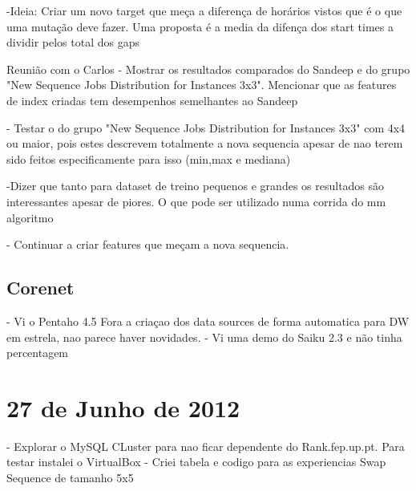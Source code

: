 \documentclass[a4paper,10pt]{article}
\begin{document}
-Ideia: Criar um novo target que meça a diferença de horários vistos que é o que uma mutação deve fazer. Uma proposta é a media da difença dos start times a dividir pelos total dos gaps

Reunião com o Carlos
- Mostrar os resultados comparados do Sandeep e do grupo "New Sequence Jobs Distribution for Instances 3x3". Mencionar que as features de index criadas tem desempenhos semelhantes ao Sandeep

- Testar o do grupo "New Sequence Jobs Distribution for Instances 3x3" com 4x4 ou maior, pois estes descrevem totalmente a nova sequencia apesar de nao terem sido feitos especificamente para isso (min,max e mediana)

-Dizer que tanto para dataset de treino pequenos e grandes os resultados são interessantes apesar de piores. O que pode ser utilizado numa corrida do mm algoritmo

- Continuar a criar features que meçam a nova sequencia.

\subsection{Corenet}

- Vi o Pentaho 4.5  Fora a criaçao dos data sources de forma automatica para DW em estrela, nao parece haver novidades. 
- Vi uma demo do Saiku 2.3 e não tinha percentagem



\section{27 de Junho de 2012}

- Explorar o MySQL CLuster para nao ficar dependente do Rank.fep.up.pt. Para testar instalei o VirtualBox
- Criei tabela e codigo para as experiencias Swap Sequence de tamanho 5x5
\end{document}
